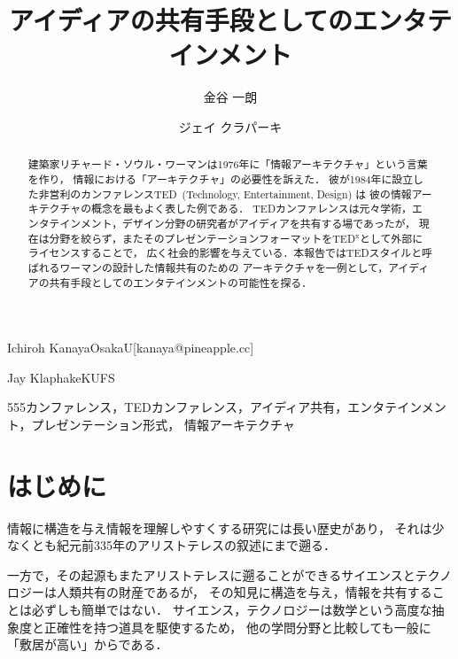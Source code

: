 \documentclass[submit,techreq,jkeyword,noauthor]{ipsj}
\newcommand{\TED}{\textrm{TED}}
\newcommand{\TEDx}{\TED${}^{\textrm{x}}$}
\begin{document}
\title{アイディアの共有手段としてのエンタテインメント}




\author{金谷 一朗}{Ichiroh Kanaya}{OsakaU}[kanaya@pineapple.cc]
\author{ジェイ クラパーキ}{Jay Klaphake}{KUFS}

\begin{abstract}
建築家リチャード・ソウル・ワーマンは1976年に「情報アーキテクチャ」という言葉を作り，
情報における「アーキテクチャ」の必要性を訴えた．
彼が1984年に設立した非営利のカンファレンス\TED\ (Technology, Entertainment, Design) は
彼の情報アーキテクチャの概念を最もよく表した例である．
\TED カンファレンスは元々学術，エンタテインメント，デザイン分野の研究者がアイディアを共有する場であったが，
現在は分野を絞らず，またそのプレゼンテーションフォーマットを\TEDx として外部にライセンスすることで，
広く社会的影響を与えている．本報告では\TED スタイルと呼ばれるワーマンの設計した情報共有のための
アーキテクチャを一例として，アイディアの共有手段としてのエンタテインメントの可能性を探る．
\end{abstract}


\begin{jkeyword}
555カンファレンス，\TED カンファレンス，アイディア共有，エンタテインメント，プレゼンテーション形式，
情報アーキテクチャ
\end{jkeyword}

\maketitle

\section{はじめに}


情報に構造を与え情報を理解しやすくする研究には長い歴史があり，
それは少なくとも紀元前335年のアリストテレスの叙述にまで遡る．\cite{a}

一方で，その起源もまたアリストテレスに遡ることができるサイエンスとテクノロジーは人類共有の財産であるが，
その知見に構造を与え，情報を共有することは必ずしも簡単ではない．
サイエンス，テクノロジーは数学という高度な抽象度と正確性を持つ道具を駆使するため，
他の学問分野と比較しても一般に「敷居が高い」からである．
\end{document}
